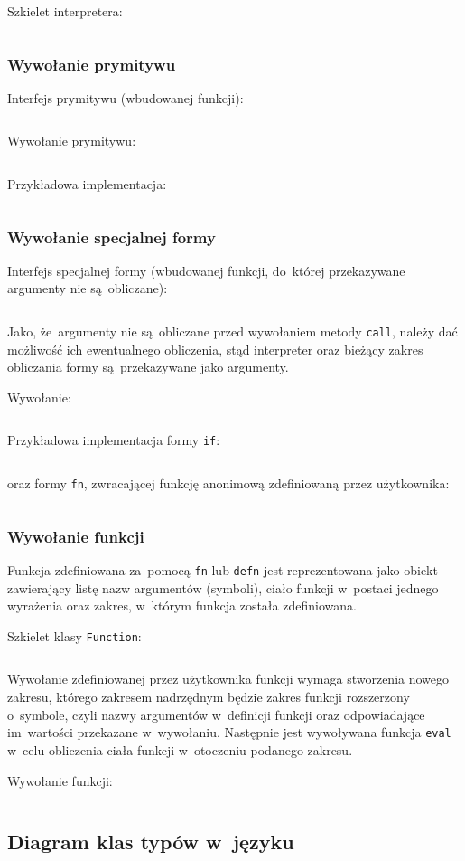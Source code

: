 \documentclass[a4paper,11pt]{article}
\newcommand{\impl}[1]{
\inputminted[fontsize=\footnotesize,frame=single,samepage=true]{java}{impl/#1.java}
}
\begin{document}
Szkielet interpretera:
\impl{Interpreter}

\subsubsection{Wywołanie prymitywu}

Interfejs prymitywu (wbudowanej funkcji):
\impl{Primitive}

Wywołanie prymitywu:
\impl{evalPrimitive}

Przykładowa implementacja:
\impl{MultiplyPrimitive}

\subsubsection{Wywołanie specjalnej formy}

Interfejs specjalnej formy (wbudowanej funkcji, do~której przekazywane
argumenty nie są~obliczane):
\impl{SpecialForm}
Jako, że~argumenty nie są~obliczane przed wywołaniem metody \verb+call+, należy
dać możliwość ich ewentualnego obliczenia, stąd interpreter oraz bieżący zakres
obliczania formy są~przekazywane jako argumenty.

Wywołanie:
\impl{evalSpecialForm}

Przykładowa implementacja formy \verb+if+:
\impl{IfForm}
oraz formy \verb+fn+, zwracającej funkcję anonimową zdefiniowaną przez
użytkownika:
\impl{FnForm}

\subsubsection{Wywołanie funkcji}

Funkcja zdefiniowana za~pomocą \verb+fn+ lub \verb+defn+ jest reprezentowana
jako obiekt zawierający listę nazw argumentów (symboli), ciało funkcji
w~postaci jednego wyrażenia oraz zakres, w~którym funkcja została zdefiniowana.

Szkielet klasy \verb+Function+:
\impl{Function}

Wywołanie zdefiniowanej przez użytkownika funkcji wymaga stworzenia nowego
zakresu, którego zakresem nadrzędnym będzie zakres funkcji rozszerzony
o~symbole, czyli nazwy argumentów w~definicji funkcji oraz odpowiadające
im~wartości przekazane w~wywołaniu. Następnie jest wywoływana funkcja
\verb+eval+ w~celu obliczenia ciała funkcji w~otoczeniu podanego zakresu.

Wywołanie funkcji:
\impl{evalFunction}

\subsection{Diagram klas typów w~języku}
\end{document}
